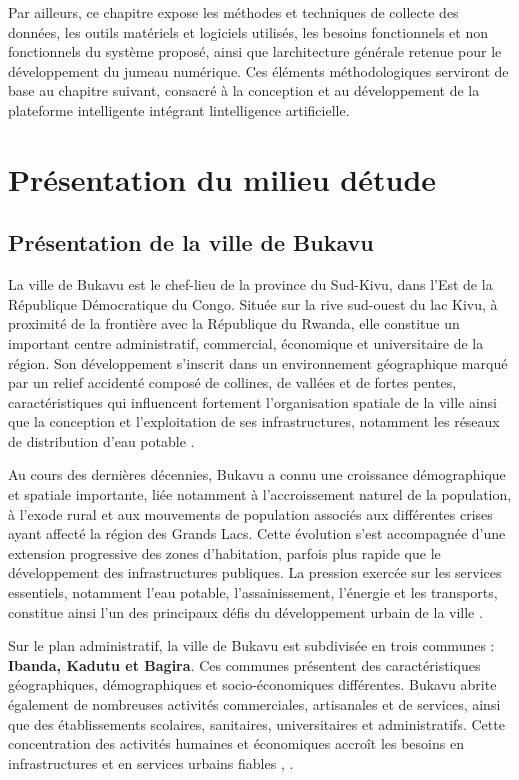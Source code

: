 Par ailleurs, ce chapitre expose les méthodes et techniques de collecte
des données, les outils matériels et logiciels utilisés, les besoins
fonctionnels et non fonctionnels du système proposé, ainsi que
l\textquotesingle architecture générale retenue pour le développement du
jumeau numérique. Ces éléments méthodologiques serviront de base au
chapitre suivant, consacré à la conception et au développement de la
plateforme intelligente intégrant l\textquotesingle intelligence
artificielle.

\section{Présentation du milieu d\textquotesingle étude}\label{pruxe9sentation-du-milieu-duxe9tude}

\subsection{Présentation de la ville de Bukavu}
\label{presentation-de-la-ville-de-bukavu}

La ville de Bukavu est le chef-lieu de la province du Sud-Kivu,
dans l'Est de la République Démocratique du Congo. Située sur la rive
sud-ouest du lac Kivu, à proximité de la frontière avec la République du
Rwanda, elle constitue un important centre administratif, commercial,
économique et universitaire de la région. Son développement s'inscrit
dans un environnement géographique marqué par un relief accidenté
composé de collines, de vallées et de fortes pentes, caractéristiques
qui influencent fortement l'organisation spatiale de la ville ainsi que
la conception et l'exploitation de ses infrastructures, notamment les
réseaux de distribution d'eau potable \cite{ref83}.

Au cours des dernières décennies, Bukavu a connu une croissance
démographique et spatiale importante, liée notamment à l'accroissement
naturel de la population, à l'exode rural et aux mouvements de population
associés aux différentes crises ayant affecté la région des Grands Lacs.
Cette évolution s'est accompagnée d'une extension progressive des zones
d'habitation, parfois plus rapide que le développement des infrastructures
publiques. La pression exercée sur les services essentiels, notamment
l'eau potable, l'assainissement, l'énergie et les transports, constitue
ainsi l'un des principaux défis du développement urbain de la ville
\cite{ref82}.

Sur le plan administratif, la ville de Bukavu est subdivisée en trois
communes : \textbf{Ibanda, Kadutu et Bagira}. Ces communes présentent
des caractéristiques géographiques, démographiques et socio-économiques
différentes. Bukavu abrite également de nombreuses activités
commerciales, artisanales et de services, ainsi que des établissements
scolaires, sanitaires, universitaires et administratifs. Cette
concentration des activités humaines et économiques accroît les besoins
en infrastructures et en services urbains fiables
\cite{ref84}, \cite{ref85}.

